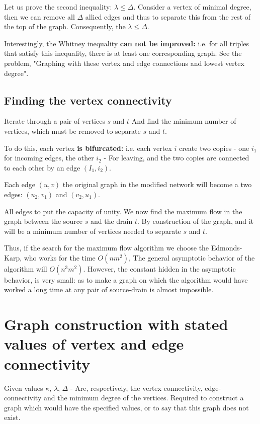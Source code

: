 Let us prove the second inequality: $\lambda \le \Delta$. Consider a vertex of minimal degree, then we can remove all $\Delta$ allied edges and thus to separate this from the rest of the top of the graph. Consequently, the $\lambda \le \Delta$.

Interestingly, the Whitney inequality \textbf{can not be improved:} i.e. for all triples that satisfy this inequality, there is at least one corresponding graph. See the problem, "Graphing with these vertex and edge connections and lowest vertex degree".

\subsection{ Finding the vertex connectivity }

Iterate through a pair of vertices $s$ and $t$ And find the minimum number of vertices, which must be removed to separate $s$ and $t$.

To do this, each vertex \textbf{is bifurcated:} i.e. each vertex $i$ create two copies - one $i_1$ for incoming edges, the other $i_2$ - For leaving, and the two copies are connected to each other by an edge $(I_1, i_2)$.

Each edge $(u, v)$ the original graph in the modified network will become a two edges: $(u_2, v_1)$ and $(v_2, u_1)$.

All edges to put the capacity of unity. We now find the maximum flow in the graph between the source $s$ and the drain $t$. By construction of the graph, and it will be a minimum number of vertices needed to separate $s$ and $t$.

Thus, if the search for the maximum flow algorithm we choose the Edmonds-Karp, who works for the time $O (n m ^ 2)$, The general asymptotic behavior of the algorithm will $O (n ^ 3 m ^ 2)$. However, the constant hidden in the asymptotic behavior, is very small: as to make a graph on which the algorithm would have worked a long time at any pair of source-drain is almost impossible.

\section{ Graph construction with stated values ​​of vertex and edge connectivity }
Given values $\kappa$, $\lambda$, $\Delta$ - Are, respectively, the vertex connectivity, edge-connectivity and the minimum degree of the vertices. Required to construct a graph which would have the specified values, or to say that this graph does not exist.

